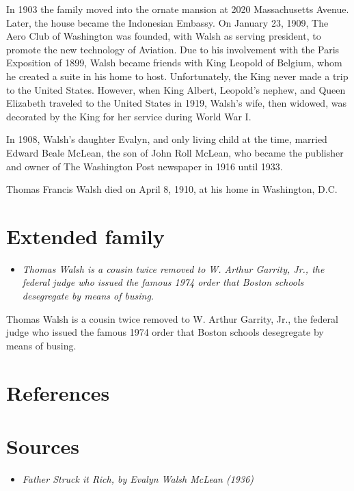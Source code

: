 In 1903 the family moved into the ornate mansion at 2020 Massachusetts
Avenue. Later, the house became the Indonesian Embassy. On January 23,
1909, The Aero Club of Washington was founded, with Walsh as serving
president, to promote the new technology of Aviation. Due to his
involvement with the Paris Exposition of 1899, Walsh became friends with
King Leopold of Belgium, whom he created a suite in his home to host.
Unfortunately, the King never made a trip to the United States. However,
when King Albert, Leopold's nephew, and Queen Elizabeth traveled to the
United States in 1919, Walsh's wife, then widowed, was decorated by the
King for her service during World War I.

In 1908, Walsh's daughter Evalyn, and only living child at the time,
married Edward Beale McLean, the son of John Roll McLean, who became the
publisher and owner of The Washington Post newspaper in 1916 until 1933.

Thomas Francis Walsh died on April 8, 1910, at his home in Washington,
D.C.

\section{Extended family}\label{extended-family}

\begin{itemize}
\item
  \emph{Thomas Walsh is a cousin twice removed to W. Arthur Garrity,
  Jr., the federal judge who issued the famous 1974 order that Boston
  schools desegregate by means of busing.}
\end{itemize}

Thomas Walsh is a cousin twice removed to W. Arthur Garrity, Jr., the
federal judge who issued the famous 1974 order that Boston schools
desegregate by means of busing.

\section{References}\label{references}

\section{Sources}\label{sources}

\begin{itemize}
\item
  \emph{Father Struck it Rich, by Evalyn Walsh McLean (1936)}
\end{itemize}

